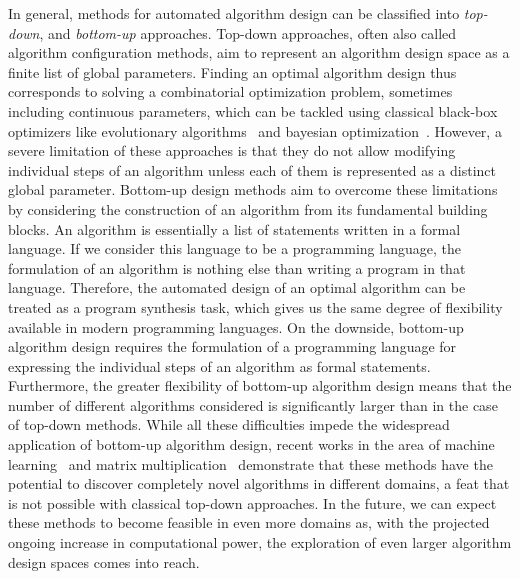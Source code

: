 In general, methods for automated algorithm design can be classified into \emph{top-down}, and \emph{bottom-up} approaches.
Top-down approaches, often also called algorithm configuration methods, aim to represent an algorithm design space as a finite list of global parameters.
Finding an optimal algorithm design thus corresponds to solving a combinatorial optimization problem, sometimes including continuous parameters, which can be tackled using classical black-box optimizers like evolutionary algorithms~\cite{back1996evolutionary} and bayesian optimization~\cite{frazier2018tutorial}.
However, a severe limitation of these approaches is that they do not allow modifying individual steps of an algorithm unless each of them is represented as a distinct global parameter.
Bottom-up design methods aim to overcome these limitations by considering the construction of an algorithm from its fundamental building blocks.
An algorithm is essentially a list of statements written in a formal language.
If we consider this language to be a programming language, the formulation of an algorithm is nothing else than writing a program in that language.
Therefore, the automated design of an optimal algorithm can be treated as a program synthesis task, which gives us the same degree of flexibility available in modern programming languages.
On the downside, bottom-up algorithm design requires the formulation of a programming language for expressing the individual steps of an algorithm as formal statements.
Furthermore, the greater flexibility of bottom-up algorithm design means that the number of different algorithms considered is significantly larger than in the case of top-down methods.
While all these difficulties impede the widespread application of bottom-up algorithm design, recent works in the area of machine learning~\cite{real2020automl,co2021evolving} and matrix multiplication~\cite{fawzi2022discovering} demonstrate that these methods have the potential to discover completely novel algorithms in different domains, a feat that is not possible with classical top-down approaches.
In the future, we can expect these methods to become feasible in even more domains as, with the projected ongoing increase in computational power, the exploration of even larger algorithm design spaces comes into reach.

